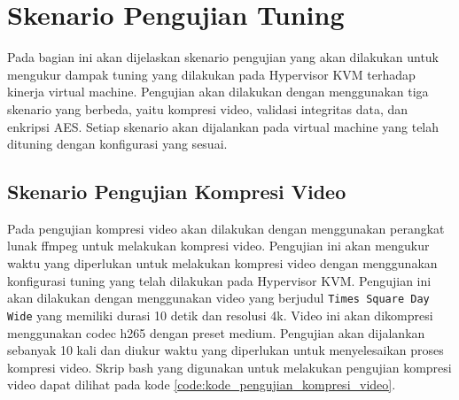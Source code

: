 \section{Skenario Pengujian Tuning}
Pada bagian ini akan dijelaskan skenario pengujian yang akan dilakukan untuk mengukur dampak tuning yang dilakukan pada Hypervisor KVM terhadap kinerja virtual machine. Pengujian akan dilakukan dengan menggunakan tiga skenario yang berbeda, yaitu kompresi video, validasi integritas data, dan enkripsi AES. Setiap skenario akan dijalankan pada virtual machine yang telah dituning dengan konfigurasi yang sesuai.

\subsection{Skenario Pengujian Kompresi Video}
Pada pengujian kompresi video akan dilakukan dengan menggunakan perangkat lunak ffmpeg untuk melakukan kompresi video. Pengujian ini akan mengukur waktu yang diperlukan untuk melakukan kompresi video dengan menggunakan konfigurasi tuning yang telah dilakukan pada Hypervisor KVM. Pengujian ini akan dilakukan dengan menggunakan video yang berjudul \texttt{Times Square Day Wide} yang memiliki durasi 10 detik dan resolusi 4k. Video ini akan dikompresi menggunakan codec h265 dengan preset medium. Pengujian akan dijalankan sebanyak 10 kali dan diukur waktu yang diperlukan untuk menyelesaikan proses kompresi video. Skrip bash yang digunakan untuk melakukan pengujian kompresi video dapat dilihat pada kode \ref{code:kode_pengujian_kompresi_video}.

